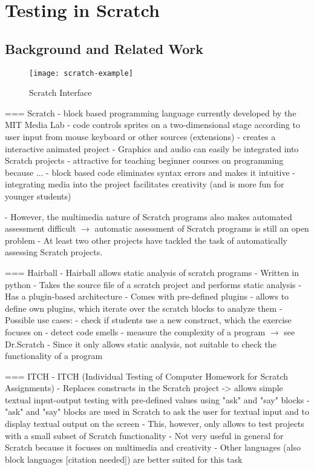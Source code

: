 \chapter{Testing in Scratch}

\section{Background and Related Work}

\begin{wrapfigure}{r}{0.5\textwidth}
    \centering
    \texttt{[image: scratch-example]}
    \caption{Scratch Interface}
    \label{fig:scratch_interface}
\end{wrapfigure}
=== Scratch
- block based programming language currently developed by the MIT Media Lab \cite{scratch, scratchproject}
- code controls sprites on a two-dimensional stage according to user input from mouse keyboard or other sources (extensions)
- creates a interactive animated project
- Graphics and audio can easily be integrated into Scratch projects
- attractive for teaching beginner courses on programming because ...
    - block based code eliminates syntax errors and makes it intuitive
    - integrating media into the project facilitates creativity (and is more fun for younger students)

- However, the multimedia nature of Scratch programs also makes automated assessment difficult
$\rightarrow$ automatic assessment of Scratch programs is still an open problem
- At least two other projects have tackled the task of automatically assessing Scratch projects.

=== Hairball
- Hairball \cite{hairball} allows static analysis of scratch programs
- Written in python
- Takes the source file of a scratch project and performs static analysis
- Has a plugin-based architecture
    - Comes with pre-defined plugins
    - allows to define own plugins, which iterate over the scratch blocks to analyze them
- Possible use cases:
    - check if students use a new construct, which the exercise focuses on
    - detect code smells
    - measure the complexity of a program $\rightarrow$ see Dr.Scratch
- Since it only allows static analysis, not suitable to check the functionality of a program

=== ITCH
- ITCH (Individual Testing of Computer Homework for Scratch Assignments) \cite{itch}
- Replaces constructs in the Scratch project
    -> allows simple textual input-output testing with pre-defined values using "ask" and "say" blocks
    - "ask" and "say" blocks are used in Scratch to ask the user for textual input and to display textual output on the screen
- This, however,  only allows to test projects with a small subset of Scratch functionality
- Not very useful in general for Scratch because it focuses on multimedia and creativity
- Other languages (also block languages [citation needed]) are better suited for this task

